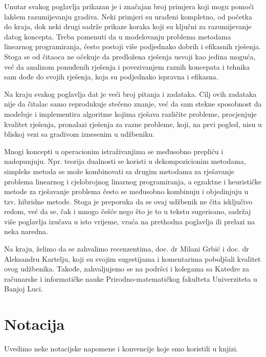 \documentclass[b5paper, utf8, 11pt, colorlinks]{book}
\theoremstyle{definition}
\begin{document}
Unutar svakog poglavlja prikazan je i značajan broj primjera koji mogu pomoći lakšem razumijevanju gradiva. Neki primjeri su urađeni kompletno, od početka do kraja, dok neki drugi sadrže prikaze koraka koji su klju\v cni za razumijevanje datog koncepta. Treba pomenuti da u modelovanju problema metodama linearnog programiranja, često postoji više podjednako dobrih i efikasnih rješenja. Stoga se od čitaoca ne očekuje da predložena rješenja usvoji kao jedina moguća, već da analizom ponuđenih rješenja i povezivanjem raznih koncepata i tehnika sam dođe do svojih rješenja, koja su podjednako ispravna i efikasna.

Na kraju svakog poglavlja dat je veći broj pitanja i zadataka. Cilj ovih zadataka nije da čitalac samo reprodukuje stečeno znanje, već da sam stekne sposobnost da modeluje i implementira algoritme kojima rješava različite probleme, procjenjuje kvalitet rješenja, pronalazi rješenja za razne probleme, koji, na prvi pogled, nisu u bliskoj vezi sa gradivom iznesenim u udžbeniku.

Mnogi koncepti u operacionim istraživanjima se međusobno prepliću i nadopunjuju. Npr. teorija dualnosti se koristi u dekompozicionim metodama, simpleks metoda se može kombinovati sa drugim metodama za rješavanje problema linearnog i cjelobrojnog linarnog programiranja, a egzaktne i heurističke metode za rješavanje problema često se međusobno kombinuju i objedinjuju u tzv. hibridne metode.
Stoga je preporuka da se ovaj udžbenik ne čita isključivo redom, već da se, čak i mnogo češće nego što je to u tekstu sugerisano, sadržaj više poglavlja izučava u isto vrijeme, vraća na prethodna poglavlja ili prelazi na neka naredna.

Na kraju, želimo da se zahvalimo recenzentima, doc. dr Milani Grbić i doc. dr Aleksandru Kartelju, koji su svojim sugestijama i komentarima poboljšali kvalitet ovog udžbenika. Takođe, zahvaljujemo se na podršci i kolegama sa Katedre za računarske i informatičke nauke Prirodno-matematičkog fakulteta Univerziteta u Banjoj Luci.



\chapter*{Notacija}

Uvedimo neke notacijske napomene i konvencije koje smo koristili u knjizi.
\end{document}

